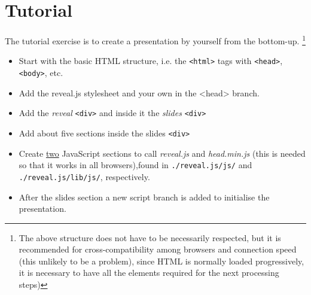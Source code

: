 \documentclass[a4paper]{article}
\begin{document}
\section{Tutorial}
The tutorial exercise is to create a presentation by yourself from the bottom-up.
\footnote{The above structure does not have to be necessarily respected, but it is recommended for cross-compatibility among browsers and connection speed (this unlikely to be a problem), since HTML is normally loaded progressively, it is necessary to have all the elements required for the next processing steps)}
\begin{itemize}
\item Start with the basic HTML structure, i.e. the \texttt{<html>} tags with \texttt{<head>}, \texttt{<body>}, etc.
\item Add the reveal.js stylesheet and your own in the <head> branch.
\item Add the \textit{reveal} \texttt{<div>} and inside it the \textit{slides} \texttt{<div>}
\item Add about five sections inside the slides \texttt{<div>}
\item Create \underline{two} JavaScript sections to call \textit{reveal.js} and \textit{head.min.js} (this is needed so that it works in all browsers),found in \texttt{./reveal.js/js/} and \texttt{./reveal.js/lib/js/}, respectively.
\item After the slides section a new script branch is added to initialise the presentation.
\end{itemize}
\end{document}
